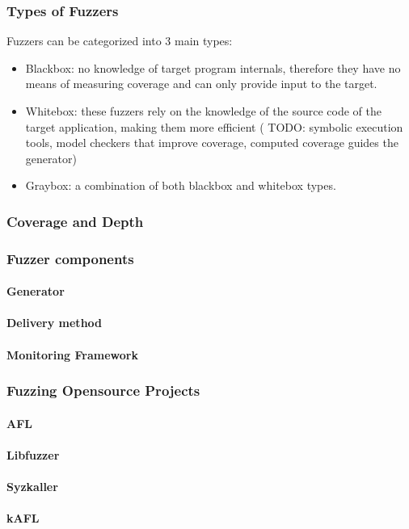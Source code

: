 
\subsubsection{Types of Fuzzers}
 
Fuzzers can be categorized into 3 main types\cite{fetzer20}:

\begin{itemize}
    \item Blackbox: no knowledge of target program internals, therefore they have no means of measuring coverage and can only provide input to the target.
    \item Whitebox: these fuzzers rely on the knowledge of the source code of the target application, making them more efficient ( TODO: symbolic execution tools, model checkers that improve coverage, computed coverage guides the generator)
    \item Graybox: a combination of both blackbox and whitebox types.
\end{itemize}


\subsubsection{Coverage and Depth}

\subsubsection{Fuzzer components}

\paragraph{Generator}

\paragraph{Delivery method}

\paragraph{Monitoring Framework}

\subsubsection{Fuzzing Opensource Projects}

\paragraph{AFL}

\paragraph{Libfuzzer}

\paragraph{Syzkaller}

\paragraph{kAFL}
